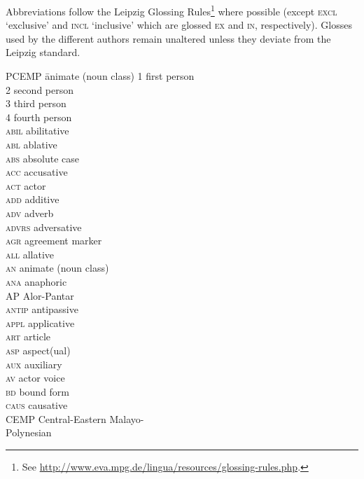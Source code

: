 
Abbreviations follow the Leipzig Glossing Rules\footnote{See \url{http://www.eva.mpg.de/lingua/resources/glossing-rules.php}.} where possible (except \textsc{excl} `exclusive' and \textsc{incl} `inclusive' which are glossed \textsc{ex} and \textsc{in}, respectively). Glosses used by the different authors remain unaltered unless they deviate from the Leipzig standard.

\begin{multicols}{2}
\begin{tabbing}
  PCEMP \hspace{.5em} \= animate (noun class)\kill
 \textsc{1}  \> first person \\
 \textsc{2}  \> second person \\
 \textsc{3}  \> third person \\
 \textsc{4}  \> fourth person \\
 \textsc{abil}  \> abilitative \\
 \textsc{abl}  \> ablative \\
 \textsc{abs}  \> absolute case \\
 \textsc{acc}  \> accusative \\
 \textsc{act}  \> actor \\
 \textsc{add}  \> additive \\
 \textsc{adv}  \> adverb \\
 \textsc{advrs} \> adversative \\
 \textsc{agr}  \> agreement marker \\
 \textsc{all}  \> allative \\
 \textsc{an}  \> animate (noun class) \\
 \textsc{ana}  \> anaphoric \\
 \textsc{AP}  \> Alor-Pantar \\
 \textsc{antip}  \> antipassive \\
 \textsc{appl}  \> applicative \\
 \textsc{art}  \> article \\
 \textsc{asp}  \> aspect(ual) \\
 \textsc{aux}  \> auxiliary \\
 \textsc{av}  \> actor voice \\
 \textsc{bd}  \> bound form \\
 \textsc{caus}  \> causative \\
 \textsc{CEMP}  \> Central-Eastern Malayo-\\\>Polynesian \\

\end{tabbing}
\end{multicols}
